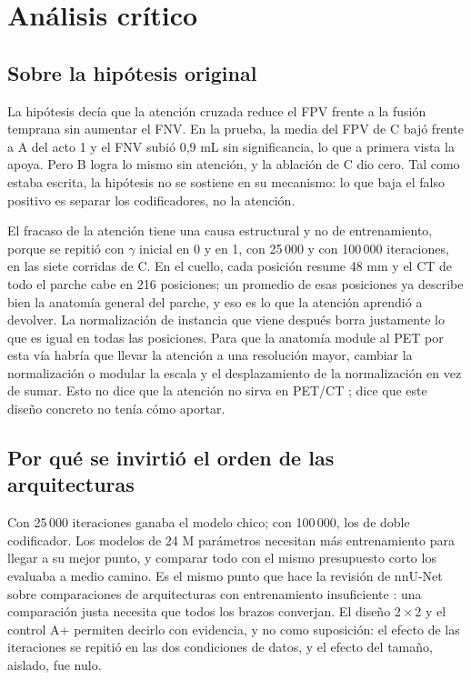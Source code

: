 \section{Análisis crítico}

\subsection{Sobre la hipótesis original}

La hipótesis decía que la atención cruzada reduce el FPV frente a la fusión temprana sin aumentar el FNV. En la prueba, la media del FPV de C bajó frente a A del acto 1 y el FNV subió 0,9 mL sin significancia, lo que a primera vista la apoya. Pero B logra lo mismo sin atención, y la ablación de C dio cero. Tal como estaba escrita, la hipótesis no se sostiene en su mecanismo: lo que baja el falso positivo es separar los codificadores, no la atención.

El fracaso de la atención tiene una causa estructural y no de entrenamiento, porque se repitió con $\gamma$ inicial en 0 y en 1, con 25\,000 y con 100\,000 iteraciones, en las siete corridas de C. En el cuello, cada posición resume 48 mm y el CT de todo el parche cabe en 216 posiciones; un promedio de esas posiciones ya describe bien la anatomía general del parche, y eso es lo que la atención aprendió a devolver. La normalización de instancia que viene después borra justamente lo que es igual en todas las posiciones. Para que la anatomía module al PET por esta vía habría que llevar la atención a una resolución mayor, cambiar la normalización o modular la escala y el desplazamiento de la normalización en vez de sumar. Esto no dice que la atención no sirva en PET/CT \citep{fu2021,huang2025,zhao2024}; dice que este diseño concreto no tenía cómo aportar.

\subsection{Por qué se invirtió el orden de las arquitecturas}

Con 25\,000 iteraciones ganaba el modelo chico; con 100\,000, los de doble codificador. Los modelos de 24 M parámetros necesitan más entrenamiento para llegar a su mejor punto, y comparar todo con el mismo presupuesto corto los evaluaba a medio camino. Es el mismo punto que hace la revisión de nnU-Net sobre comparaciones de arquitecturas con entrenamiento insuficiente \citep{isensee2024revisited}: una comparación justa necesita que todos los brazos converjan. El diseño 2\,×\,2 y el control A+ permiten decirlo con evidencia, y no como suposición: el efecto de las iteraciones se repitió en las dos condiciones de datos, y el efecto del tamaño, aislado, fue nulo.

